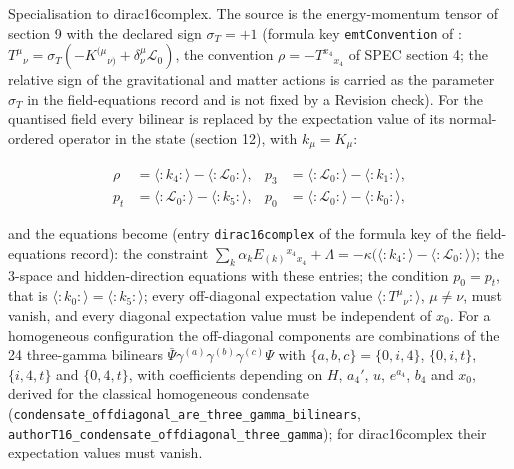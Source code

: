 \documentclass[11pt]{article}
\begin{document}
Specialisation to dirac16complex. The source is the energy-momentum tensor of section 9 with the declared sign $\sigma_T = +1$ (formula key \texttt{emtConve\allowbreak{}ntion} of \texttt{}: $T^\mu{}_\nu = \sigma_T(-K^{(\mu}{}_{\nu)} + \delta^\mu_\nu\mathcal{L}_0)$, the convention $\rho = -T^{x_4}{}_{x_4}$ of SPEC section 4; the relative sign of the gravitational and matter actions is carried as the parameter $\sigma_T$ in the field-equations record and is not fixed by a Revision check). For the quantised field every bilinear is replaced by the expectation value of its normal-ordered operator in the state (section 12), with $k_\mu = K_\mu$:

\[
\begin{aligned}
\rho &= \langle{:}k_4{:}\rangle - \langle{:}\mathcal{L}_0{:}\rangle, & p_3 &= \langle{:}\mathcal{L}_0{:}\rangle - \langle{:}k_1{:}\rangle, \\
p_t &= \langle{:}\mathcal{L}_0{:}\rangle - \langle{:}k_5{:}\rangle, & p_0 &= \langle{:}\mathcal{L}_0{:}\rangle - \langle{:}k_0{:}\rangle,
\end{aligned}
\]

and the equations become (entry \texttt{dirac16c\allowbreak{}omplex} of the formula key \texttt{} of the field-equations record): the constraint $\sum_k\alpha_k E_{(k)}{}^{x_4}{}_{x_4} + \Lambda = -\kappa\big(\langle{:}k_4{:}\rangle - \langle{:}\mathcal{L}_0{:}\rangle\big)$; the 3-space and hidden-direction equations with these entries; the condition $p_0 = p_t$, that is $\langle{:}k_0{:}\rangle = \langle{:}k_5{:}\rangle$; every off-diagonal expectation value $\langle{:}T^\mu{}_\nu{:}\rangle$, $\mu \neq \nu$, must vanish, and every diagonal expectation value must be independent of $x_0$. For a homogeneous configuration the off-diagonal components are combinations of the 24 three-gamma bilinears $\bar\Psi\gamma^{(a)}\gamma^{(b)}\gamma^{(c)}\Psi$ with $\{a, b, c\} = \{0, i, 4\}$, $\{0, i, t\}$, $\{i, 4, t\}$ and $\{0, 4, t\}$, with coefficients depending on $H$, $a_4'$, $u$, $e^{a_4}$, $b_4$ and $x_0$, derived for the classical homogeneous condensate (\texttt{condensa\allowbreak{}te\_offdi\allowbreak{}agonal\_a\allowbreak{}re\_three\allowbreak{}\_gamma\_b\allowbreak{}ilinears}, \texttt{authorT1\allowbreak{}6\_conden\allowbreak{}sate\_off\allowbreak{}diagonal\allowbreak{}\_three\_g\allowbreak{}amma}); for dirac16complex their expectation values must vanish.
\end{document}
